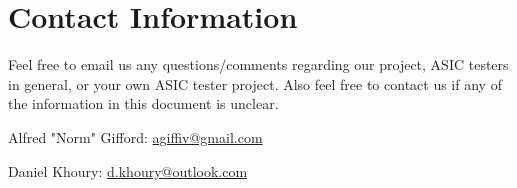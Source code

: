 \section{Contact Information}
Feel free to email us any questions/comments regarding our project, ASIC testers in general, or your own ASIC tester project. Also feel free to contact us if any of the information in this document is unclear.

\begin{flushleft}
Alfred "Norm" Gifford: \href{mailto:agiffiv@gmail.com}{agiffiv@gmail.com}

Daniel Khoury: \href{mailto:d.khoury@outlook.com}{d.khoury@outlook.com}
\end{flushleft}

\newpage

